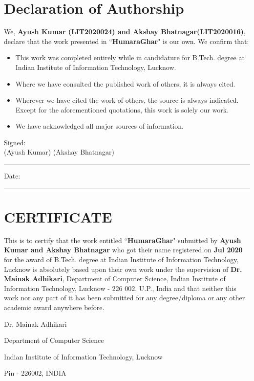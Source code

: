 \thispagestyle{empty}

\setcounter{page}{3}

\chapter*{Declaration of Authorship}

\vspace{1cm}

\noindent
We, \textbf{Ayush Kumar (LIT2020024) and Akshay Bhatnagar(LIT2020016)}, declare that the work presented in ``\textbf{HumaraGhar}" is our own. We confirm that:

\medskip

\begin{itemize}
      \item This work was completed entirely while in candidature for B.Tech. degree at Indian Institute of Information Technology, Lucknow.

            \medskip

      \item Where we have consulted the published work of others, it is always cited.

            \medskip

      \item Wherever we have cited the work of others, the source is always indicated. Except for the aforementioned quotations, this work is solely our work.

            \medskip

      \item We have acknowledged all major sources of information.
\end{itemize}

\vspace{2cm}

\noindent Signed:\\

\hspace{1.5cm}(Ayush Kumar) \hfill (Akshay Bhatnagar)
\rule[0.5em]{33em}{0.5pt}

\noindent Date:\\
\rule[0.5em]{33em}{0.5pt}

\cleardoublepage

\chapter*{CERTIFICATE}

This is to certify that the work entitled ``\textbf{HumaraGhar}" submitted by \textbf{Ayush Kumar and Akshay Bhatnagar} who got their name registered on \textbf{\;\;\; Jul 2020} for the award of B.Tech. degree at Indian Institute of Information Technology, Lucknow is absolutely based upon their own work under the supervision of \textbf{Dr. Mainak Adhikari}, Department of Computer Science, Indian Institute of Information Technology, Lucknow - 226 002, U.P., India and that neither this work nor any part of it has been submitted for any degree/diploma or any other academic award anywhere before.

\vspace{4cm}

\begin{center}
      Dr. Mainak Adhikari

      Department of Computer Science

      Indian Institute of Information Technology, Lucknow

      Pin - 226002, INDIA
\end{center}
